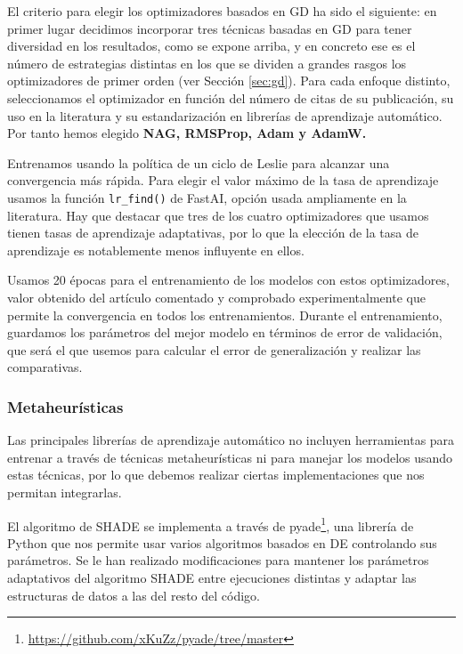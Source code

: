 El criterio para elegir los optimizadores basados en GD ha sido el siguiente: en primer lugar decidimos incorporar tres técnicas basadas en GD para tener diversidad en los resultados, como se expone arriba, y en concreto ese es el número de estrategias distintas en los que se dividen a grandes rasgos los optimizadores de primer orden (ver Sección \ref{sec:gd}). Para cada enfoque distinto, seleccionamos el optimizador en función del número de citas de su publicación, su uso en la literatura y su estandarización en librerías de aprendizaje automático. Por tanto hemos elegido \textbf{NAG, RMSProp, Adam y AdamW.}

Entrenamos usando la política de un ciclo de Leslie para alcanzar una convergencia más rápida. Para elegir el valor máximo de la tasa de aprendizaje usamos la función \verb|lr_find()| de FastAI, opción usada ampliamente en la literatura. Hay que destacar que tres de los cuatro optimizadores que usamos tienen tasas de aprendizaje adaptativas, por lo que la elección de la tasa de aprendizaje es notablemente menos influyente en ellos. 

Usamos 20 épocas para el entrenamiento de los modelos con estos optimizadores, valor obtenido del artículo comentado y comprobado experimentalmente que permite la convergencia en todos los entrenamientos. Durante el entrenamiento, guardamos los parámetros del mejor modelo en términos de error de validación, que será el que usemos para calcular el error de generalización y realizar las comparativas.




\subsubsection{Metaheurísticas}

Las principales librerías de aprendizaje automático no incluyen herramientas para entrenar a través de técnicas metaheurísticas ni para manejar los modelos usando estas técnicas, por lo que debemos realizar ciertas implementaciones que nos permitan integrarlas. 

El algoritmo de SHADE se implementa a través de pyade\footnote{\url{https://github.com/xKuZz/pyade/tree/master}}, una librería de Python que nos permite usar varios algoritmos basados en DE controlando sus parámetros. Se le han realizado modificaciones para mantener los parámetros adaptativos del algoritmo SHADE entre ejecuciones distintas y adaptar las estructuras de datos a las del resto del código.


